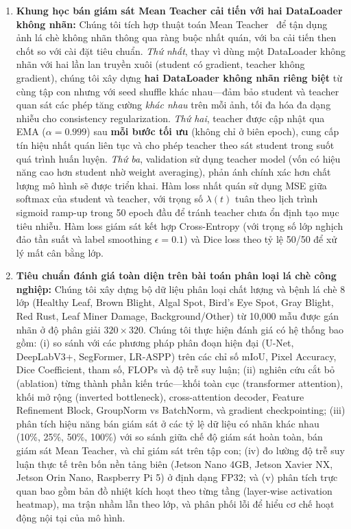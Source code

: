 \documentclass[conference]{IEEEtran}
\begin{document}
\begin{enumerate}
    \item \textbf{Khung học bán giám sát Mean Teacher cải tiến với hai DataLoader không nhãn:} Chúng tôi tích hợp thuật toán Mean Teacher~\cite{b4} để tận dụng ảnh lá chè không nhãn thông qua ràng buộc nhất quán, với ba cải tiến then chốt so với cài đặt tiêu chuẩn. \textit{Thứ nhất}, thay vì dùng một DataLoader không nhãn với hai lần lan truyền xuôi (student có gradient, teacher không gradient), chúng tôi xây dựng \textbf{hai DataLoader không nhãn riêng biệt} từ cùng tập con nhưng với seed shuffle khác nhau---đảm bảo student và teacher quan sát các phép tăng cường \textit{khác nhau} trên mỗi ảnh, tối đa hóa đa dạng nhiễu cho consistency regularization. \textit{Thứ hai}, teacher được cập nhật qua EMA ($\alpha=0.999$) sau \textbf{mỗi bước tối ưu} (không chỉ ở biên epoch), cung cấp tín hiệu nhất quán liên tục và cho phép teacher theo sát student trong suốt quá trình huấn luyện. \textit{Thứ ba}, validation sử dụng teacher model (vốn có hiệu năng cao hơn student nhờ weight averaging), phản ánh chính xác hơn chất lượng mô hình sẽ được triển khai. Hàm loss nhất quán sử dụng MSE giữa softmax của student và teacher, với trọng số $\lambda(t)$ tuân theo lịch trình sigmoid ramp-up trong 50 epoch đầu để tránh teacher chưa ổn định tạo mục tiêu nhiễu. Hàm loss giám sát kết hợp Cross-Entropy (với trọng số lớp nghịch đảo tần suất và label smoothing $\epsilon=0.1$) và Dice loss theo tỷ lệ 50/50 để xử lý mất cân bằng lớp.

    \item \textbf{Tiêu chuẩn đánh giá toàn diện trên bài toán phân loại lá chè công nghiệp:} Chúng tôi xây dựng bộ dữ liệu phân loại chất lượng và bệnh lá chè 8 lớp (Healthy Leaf, Brown Blight, Algal Spot, Bird's Eye Spot, Gray Blight, Red Rust, Leaf Miner Damage, Background/Other) từ 10,000 mẫu được gán nhãn ở độ phân giải $320 \times 320$. Chúng tôi thực hiện đánh giá có hệ thống bao gồm: (i) so sánh với các phương pháp phân đoạn hiện đại (U-Net, DeepLabV3+, SegFormer, LR-ASPP) trên các chỉ số mIoU, Pixel Accuracy, Dice Coefficient, tham số, FLOPs và độ trễ suy luận; (ii) nghiên cứu cắt bỏ (ablation) từng thành phần kiến trúc---khối toàn cục (transformer attention), khối mở rộng (inverted bottleneck), cross-attention decoder, Feature Refinement Block, GroupNorm vs BatchNorm, và gradient checkpointing; (iii) phân tích hiệu năng bán giám sát ở các tỷ lệ dữ liệu có nhãn khác nhau (10\%, 25\%, 50\%, 100\%) với so sánh giữa chế độ giám sát hoàn toàn, bán giám sát Mean Teacher, và chỉ giám sát trên tập con; (iv) đo lường độ trễ suy luận thực tế trên bốn nền tảng biên (Jetson Nano 4GB, Jetson Xavier NX, Jetson Orin Nano, Raspberry Pi 5) ở định dạng FP32; và (v) phân tích trực quan bao gồm bản đồ nhiệt kích hoạt theo từng tầng (layer-wise activation heatmap), ma trận nhầm lẫn theo lớp, và phân phối lỗi để hiểu cơ chế hoạt động nội tại của mô hình.
\end{enumerate}
\end{document}
